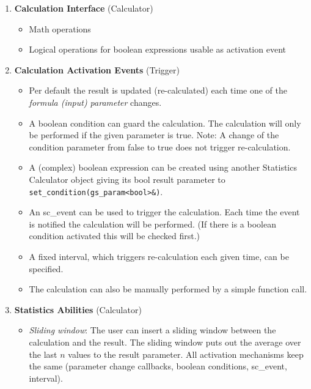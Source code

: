 \begin{enumerate}
  \item \textbf{Calculation Interface} (Calculator)\samepage
    \begin{itemize}
      \item Math operations
      \item Logical operations for boolean expressions usable as activation event
    \end{itemize}

  \item \textbf{Calculation Activation Events} (Trigger)
  \begin{itemize}
    \item Per default the result is updated (re-calculated) each time one of the {\em formula (input) parameter} changes.
    \item A boolean condition can guard the calculation. \newline 
    The calculation will only be performed if the given parameter is true. Note: A change of the condition parameter from false to true does not trigger re-calculation.
    \item A (complex) boolean expression can be created using another Statistics Calculator object giving its bool result parameter to \lstinline[language=TeX]|set_condition(gs_param<bool>&)|.
    \item An {\sffamily sc\_event} can be used to trigger the calculation. Each time the event is notified the calculation will be performed. (If there is a boolean condition activated this will be checked first.)
    \item A fixed interval, which triggers re-calculation each given time, can be specified.
    \item The calculation can also be manually performed by a simple function call.
  \end{itemize}

  \item \textbf{Statistics Abilities} (Calculator)
  \begin{itemize}
    \item {\em Sliding window}: The user can insert a sliding window between the calculation and the result. The sliding window puts out the average over the last $n$ values to the result parameter. \newline
    All activation mechanisms keep the same (parameter change callbacks, boolean conditions, {\sffamily sc\_event}, interval).
  \end{itemize}
\end{enumerate}

